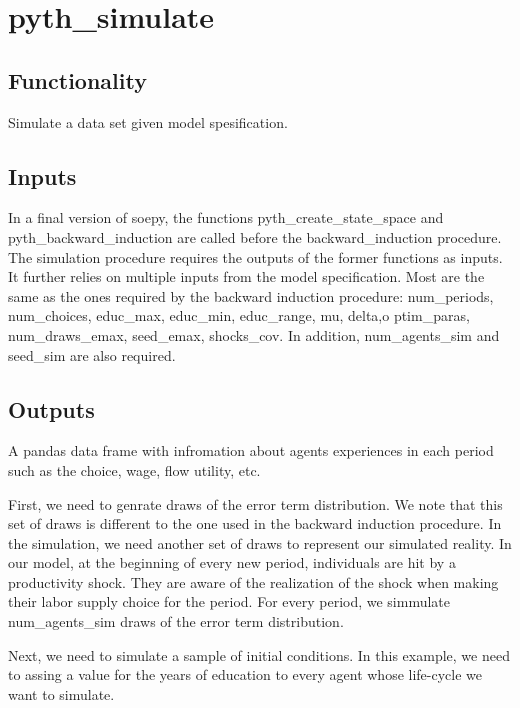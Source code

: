 \documentclass[letterpaper,10pt,english]{sphinxmanual}
\begin{document}
\section{pyth\_simulate}
\label{\detokenize{developer_docs:pyth-simulate}}

\subsection{Functionality}
\label{\detokenize{developer_docs:id5}}
Simulate a data set given model spesification.


\subsection{Inputs}
\label{\detokenize{developer_docs:id6}}
In a final version of soepy, the functions pyth\_create\_state\_space and pyth\_backward\_induction are called before the backward\_induction procedure. The simulation procedure requires the outputs of the former functions as inputs. It further relies on multiple inputs from the model specification. Most are the same as the ones required by the backward induction procedure: num\_periods, num\_choices, educ\_max, educ\_min, educ\_range, mu, delta,o ptim\_paras, num\_draws\_emax, seed\_emax, shocks\_cov. In addition, num\_agents\_sim and seed\_sim are also required.


\subsection{Outputs}
\label{\detokenize{developer_docs:id7}}
A pandas data frame with infromation about agents experiences in each period such as the choice, wage, flow utility, etc.

First, we need to genrate draws of the error term distribution. We note that this set of draws is different to the one used in the backward induction procedure. In the simulation, we need another set of draws to represent our simulated reality. In our model, at the beginning of every new period, individuals are hit by a productivity shock. They are aware of the realization of the shock when making their labor supply choice for the period. For every period, we simmulate num\_agents\_sim draws of the error term distribution.

Next, we need to simulate a sample of initial conditions. In this example, we need to assing a value for the years of education to every agent whose life-cycle we want to simulate.
\end{document}
